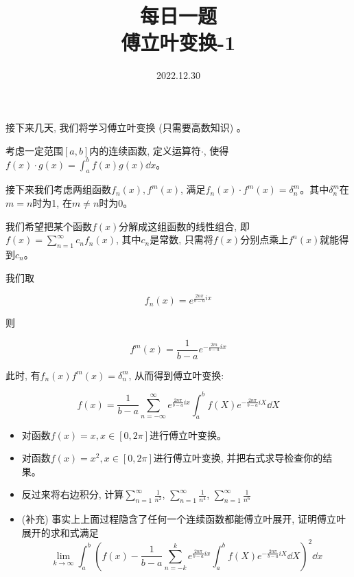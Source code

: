 \documentclass {ctexart}
\title {每日一题\\{\small 傅立叶变换-1}}
\date{2022.12.30}
\begin{document}
    \maketitle {}

    接下来几天, 我们将学习傅立叶变换 (只需要高数知识) 。

    考虑一定范围\([a,b]\)内的连续函数, 定义运算符\(\cdot\), 使得\(f(x) \cdot g(x) = \int_a^b f(x)g(x) \dd x\)。

    接下来我们考虑两组函数\(f_n(x),f^m(x)\), 满足\(f_n(x) \cdot f^m(x) = \delta_n^m\)。其中\(\delta_n^m\)在\(m=n\)时为1, 在\(m \neq n\)时为0。

    我们希望把某个函数\(f(x)\)分解成这组函数的线性组合, 即\(f(x) = \sum_{n=1}^\infty c_n f_n(x)\), 其中\(c_n\)是常数, 只需将\(f(x)\)分别点乘上\(f^n(x)\)就能得到\(c_n\)。
    
    我们取

    \[
        f_n(x) = e^{\frac{2n\pi}{b-a} i x}
    \]

    则

    \[
        f^m(x) = \frac{1}{b-a} e^{-\frac{2m}{b-a} i x}
    \]

    此时, 有\(f_n(x)f^m(x) = \delta_n^m\), 从而得到傅立叶变换:

    \begin{equation}
        f(x) = \frac{1}{b-a} \sum_{n=-\infty}^{\infty} e^{\frac{2n\pi}{b-a} i x} \int_a^b f(X)e^{-\frac{2n\pi}{b-a} i X} \dd X
    \end{equation}
        

    \begin{itemize}
        \item 对函数\(f(x) = x, x \in [0,2\pi] \)进行傅立叶变换。
        \item 对函数\(f(x) = x^2, x \in [0,2\pi] \)进行傅立叶变换, 并把右式求导检查你的结果。
        \item 反过来将右边积分, 计算\(\sum_{n=1}^{\infty} \frac{1}{n^2}\), \(\sum_{n=1}^{\infty} \frac{1}{n^4}\), \(\sum_{n=1}^{\infty} \frac{1}{n^6}\)
        \item (补充) 事实上上面过程隐含了任何一个连续函数都能傅立叶展开, 证明傅立叶展开的求和式满足
        \[
            \lim_{k \rightarrow \infty} \int_a^b (f(x) - \frac{1}{b-a}\sum_{n=-k}^{k} e^{\frac{2n\pi}{b-a} i x} \int_a^b f(X)e^{-\frac{2n\pi}{b-a} i X} \dd X )^2 \dd x
        \]
    \end{itemize}
\end{document}
